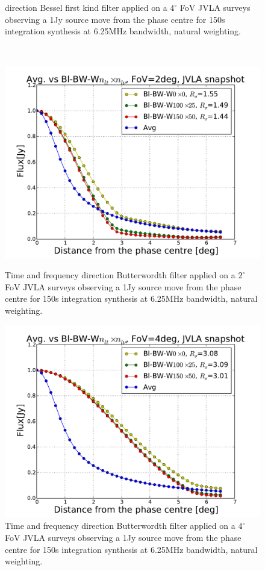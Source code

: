 \documentclass[useAMS,usenatbib]{mn2e}
\begin{document}
\begin{figure}
\begin{minipage}{0.36\linewidth}
{  direction Bessel first kind filter applied on a $4^{\circ}$ FoV JVLA surveys observing a 1Jy source move from the phase centre for 150s 
  integration synthesis at 6.25MHz bandwidth, natural weighting.}\label{fig:Bl-bessel-FoV4}\end{minipage}\\
  \begin{minipage}{0.36\linewidth}\includegraphics[width=1\textwidth]{./Figures/Bl-butter-FoV2-vla.pdf}\caption{Time and frequency 
  direction Butterwordth filter applied on a $2^{\circ}$ FoV JVLA surveys observing a 1Jy source move from the phase centre for 
  150s integration synthesis at 6.25MHz bandwidth, natural weighting.}\label{fig:Bl-butter-FoV2}\end{minipage}
  \hspace{1cm}
  \begin{minipage}{0.36\linewidth}\includegraphics[width=1\textwidth]{./Figures/Bl-butter-FoV4-vla.pdf}\caption{Time and frequency 
  direction Butterwordth filter applied on a $4^{\circ}$ FoV JVLA surveys observing a 1Jy source move from the phase centre for 150s 
  integration synthesis at 6.25MHz bandwidth, natural weighting.}\label{fig:Bl-butter-FoV4}\end{minipage}
  \end{figure}
\end{document}
